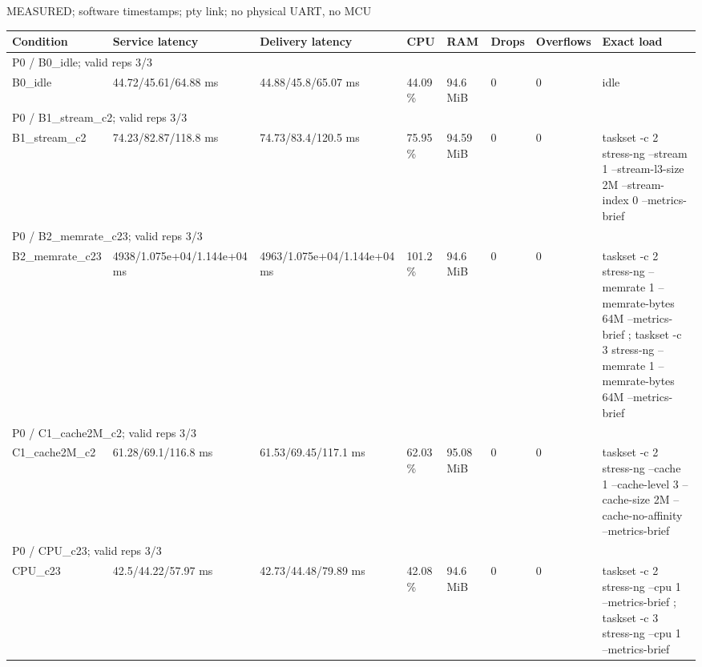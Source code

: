\par\noindent MEASURED; software timestamps; pty link; no physical UART, no MCU\par
\begin{tabular}{llllllll}
\toprule
Condition & Service latency & Delivery latency & CPU & RAM & Drops & Overflows & Exact load \\
\midrule
\multicolumn{8}{l}{P0 / B0\_idle; valid reps 3/3} \\
B0\_idle & 44.72/45.61/64.88 ms & 44.88/45.8/65.07 ms & 44.09 \% & 94.6 MiB & 0 & 0 & idle \\
\multicolumn{8}{l}{P0 / B1\_stream\_c2; valid reps 3/3} \\
B1\_stream\_c2 & 74.23/82.87/118.8 ms & 74.73/83.4/120.5 ms & 75.95 \% & 94.59 MiB & 0 & 0 & taskset -c 2 stress-ng --stream 1 --stream-l3-size 2M --stream-index 0 --metrics-brief \\
\multicolumn{8}{l}{P0 / B2\_memrate\_c23; valid reps 3/3} \\
B2\_memrate\_c23 & 4938/1.075e+04/1.144e+04 ms & 4963/1.075e+04/1.144e+04 ms & 101.2 \% & 94.6 MiB & 0 & 0 & taskset -c 2 stress-ng --memrate 1 --memrate-bytes 64M --metrics-brief ; taskset -c 3 stress-ng --memrate 1 --memrate-bytes 64M --metrics-brief \\
\multicolumn{8}{l}{P0 / C1\_cache2M\_c2; valid reps 3/3} \\
C1\_cache2M\_c2 & 61.28/69.1/116.8 ms & 61.53/69.45/117.1 ms & 62.03 \% & 95.08 MiB & 0 & 0 & taskset -c 2 stress-ng --cache 1 --cache-level 3 --cache-size 2M --cache-no-affinity --metrics-brief \\
\multicolumn{8}{l}{P0 / CPU\_c23; valid reps 3/3} \\
CPU\_c23 & 42.5/44.22/57.97 ms & 42.73/44.48/79.89 ms & 42.08 \% & 94.6 MiB & 0 & 0 & taskset -c 2 stress-ng --cpu 1 --metrics-brief ; taskset -c 3 stress-ng --cpu 1 --metrics-brief \\
\bottomrule
\end{tabular}
